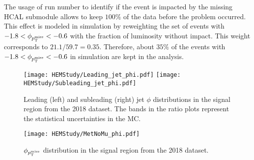 The usage of run number to identify if the event is impacted by the missing HCAL submodule allows to keep $100\%$ of the data   
before the problem occurred. This effect is modeled in simulation by reweighting the set of events with $-1.8 < \phi_{p_{\textrm{T}}^{\textrm{miss}}} < -0.6$
with the fraction of luminosity without impact. This weight corresponds to $21.1 / 59.7 = 0.35$. Therefore, about $35\%$ of the events
with $-1.8 < \phi_{p_{\textrm{T}}^{\textrm{miss}}} < -0.6$ in simulation are kept in the analysis.

\begin{figure}[htbp]
    \begin{center}
        \texttt{[image: HEMStudy/Leading\_jet\_phi.pdf]}
        \texttt{[image: HEMStudy/Subleading\_jet\_phi.pdf]}
    \end{center}
    \caption{Leading (left) and subleading (right) jet $\phi$ distributions in the signal region from the 2018 dataset.
    The bands in the ratio plots represent the statistical uncertainties in the MC.}
    \label{fig:sr_2018_noHemCut_jetlead}
\end{figure}

\begin{figure}[htbp]
    \begin{center}
        \texttt{[image: HEMStudy/MetNoMu\_phi.pdf]}
    \end{center}
    \caption{$\phi_{p_{\textrm{T}}^{\textrm{miss}}}$ distribution in the signal region from the 2018 dataset.}
    \label{fig:sr_2018_noHemCut_met}
\end{figure}

\clearpage